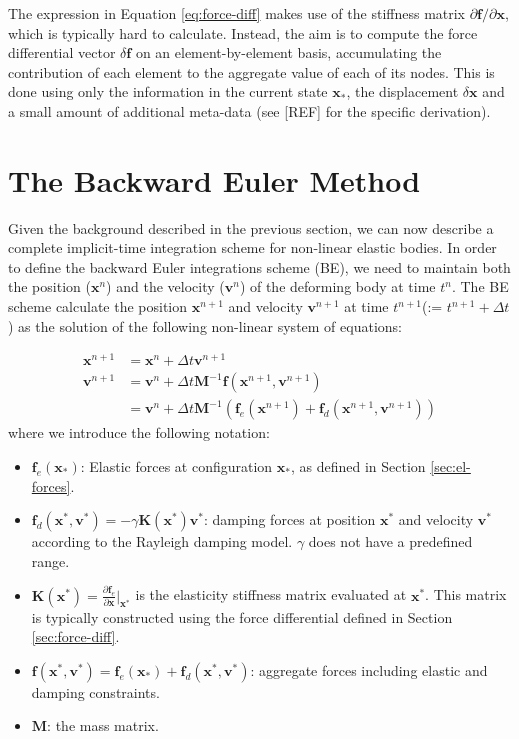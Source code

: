 \documentclass{article} %
\begin{document}
The expression in Equation \ref{eq:force-diff} makes use of the stiffness matrix $\partial \mathbf{f} / \partial \mathbf{x} $, which is typically hard to calculate. Instead, the aim is to compute the force differential vector $\delta \mathbf{f}$ on an element-by-element basis, accumulating the contribution of each element to the aggregate value of each of its nodes. This is done using only the information in the current state $\mathbf{x}_{*}$, the displacement $\delta \mathbf{x}$ and a small amount of additional meta-data (see [REF] for the specific derivation).

\section{The Backward Euler Method}

Given the background described in the previous section, we can now describe a complete implicit-time integration scheme for non-linear elastic bodies. In order to define the backward Euler integrations scheme (BE), we need to maintain both the position ($\mathbf{x}^n$) and the velocity ($\mathbf{v}^n$) of the deforming body at time $t^n$. The BE scheme calculate the position $\mathbf{x}^{n+1}$ and velocity $\mathbf{v}^{n+1}$ at time $t^{n+1}$(:= $t^{n+1} + \Delta t$) as the solution of the following non-linear system of equations: 

\begin{align}
\mathbf{x}^{n+1} &= \mathbf{x}^n + \Delta t \mathbf{v}^{n + 1}\label{eq:non-linearity-1}\\
\mathbf{v}^{n+1} &= \mathbf{v}^n + \Delta t \mathbf{M}^{-1} \mathbf{f}(\mathbf{x}^{n+1}, \mathbf{v}^{n+1})\nonumber\\
			  &= \mathbf{v}^n + \Delta t \mathbf{M}^{-1} \left ( \mathbf{f}_e(\mathbf{x}^{n+1}) + \mathbf{f}_d( \mathbf{x}^{n+1}, \mathbf{v}^{n+1} ) \right )\label{eq:non-linearity-2}
\end{align}
where we introduce the following notation:
\begin{itemize}
\item $\mathbf{f}_e( \mathbf{x}_{*} )$: Elastic forces at configuration $\mathbf{x}_{*}$, as defined in Section \ref{sec:el-forces}.
\item $\mathbf{f}_d( \mathbf{x}^*, \mathbf{v}^* ) = -\gamma \mathbf{K}(\mathbf{x}^*) \mathbf{v}^*$: damping forces at position $\mathbf{x}^*$ and velocity $\mathbf{v}^*$ according to the Rayleigh damping model. $\gamma$ does not have a predefined range. 
\item $\mathbf{K}(\mathbf{x}^*) = \frac{\partial \mathbf{f}_e}{\partial \mathbf{x}} \big |_{\mathbf{x}^*}$ is the elasticity stiffness matrix evaluated at $\mathbf{x}^*$. This matrix is typically constructed using the force differential defined in Section \ref{sec:force-diff}. 
\item $\mathbf{f}( \mathbf{x}^*, \mathbf{v}^* ) = \mathbf{f}_e( \mathbf{x}_{*} ) + \mathbf{f}_d( \mathbf{x}^*, \mathbf{v}^* )$: aggregate forces including elastic and damping constraints. 
\item $\mathbf{M}$: the mass matrix.
\end{itemize}
\end{document}
